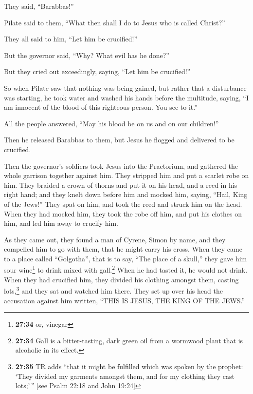 They said, ``Barabbas!''

 Pilate said to them, ``What then shall I do to Jesus who
is called Christ?''

They all said to him, ``Let him be crucified!''

 But the governor said, ``Why? What evil has he done?''

But they cried out exceedingly, saying, ``Let him be crucified!''

 So when Pilate saw that nothing was being gained, but
rather that a disturbance was starting, he took water and washed his
hands before the multitude, saying, ``I am innocent of the blood of this
righteous person. You see to it.''

 All the people answered, ``May his blood be on us and on
our children!''

 Then he released Barabbas to them, but Jesus he flogged
and delivered to be crucified.

 Then the governor's soldiers took Jesus into the
Praetorium, and gathered the whole garrison together against him.
 They stripped him and put a scarlet robe on him.
 They braided a crown of thorns and put it on his head,
and a reed in his right hand; and they knelt down before him and mocked
him, saying, ``Hail, King of the Jews!''  They spat on
him, and took the reed and struck him on the head.  When
they had mocked him, they took the robe off him, and put his clothes on
him, and led him away to crucify him.

 As they came out, they found a man of Cyrene, Simon by
name, and they compelled him to go with them, that he might carry his
cross.  When they came to a place called ``Golgotha'',
that is to say, ``The place of a skull,''  they gave him
sour wine\footnote{\textbf{27:34} or, vinegar} to drink mixed with
gall.\footnote{\textbf{27:34} Gall is a bitter-tasting, dark green oil
  from a wormwood plant that is alcoholic in its effect.} When he had
tasted it, he would not drink.  When they had crucified
him, they divided his clothing amongst them, casting lots,\footnote{\textbf{27:35}
  TR adds ``that it might be fulfilled which was spoken by the prophet:
  `They divided my garments amongst them, and for my clothing they cast
  lots;'\,'' {[}see Psalm 22:18 and John 19:24{]}}  and
they sat and watched him there.  They set up over his
head the accusation against him written, ``THIS IS JESUS, THE KING OF
THE JEWS.''

